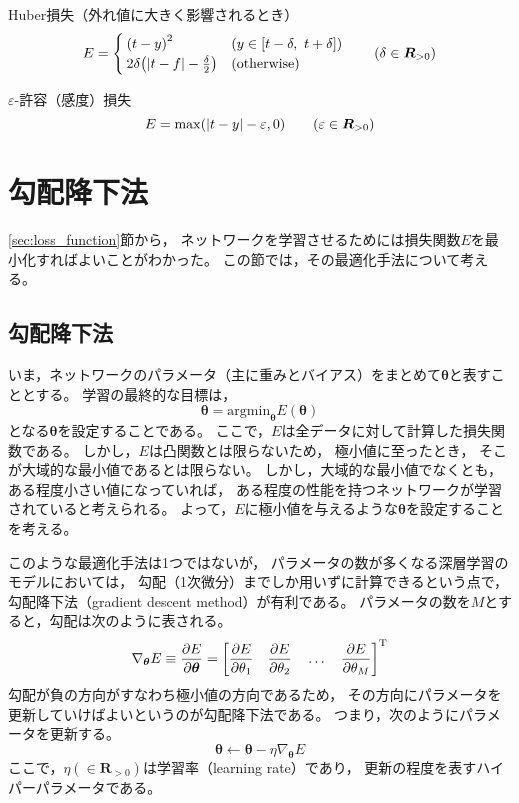 \documentclass[class=jsarticle, crop=false, dvipdfmx, fleqn]{standalone}
\begin{document}
Huber損失（外れ値に大きく影響されるとき）
\begin{equation}
E =
	\begin{cases}
		\qty(t - y)^2 & (y \in \qty[t-\delta,\ t+\delta]) \\
		2\delta \qty(|t - f| - \frac{\delta}{2}) & (\mathrm{otherwise})
	\end{cases}
	\qquad \qty(\delta \in \bm{R}_{>0})
\end{equation}

$\varepsilon$-許容（感度）損失
\begin{equation}
E = \max(|t - y| - \varepsilon, 0) \qquad \qty(\varepsilon \in \bm{R}_{>0})
\end{equation}



\section{勾配降下法}
\label{sec:gradient_descent}

\ref{sec:loss_function}節から，
ネットワークを学習させるためには損失関数$E$を最小化すればよいことがわかった。
この節では，その最適化手法について考える。


\subsection{勾配降下法}

いま，ネットワークのパラメータ（主に重みとバイアス）をまとめて$\bm{\theta}$と表すこととする。
学習の最終的な目標は，
\begin{equation}
\bm{\theta} = \mathrm{argmin}_{\bm{\theta}} E(\bm{\theta})
\end{equation}
となる$\bm{\theta}$を設定することである。
ここで，$E$は全データに対して計算した損失関数である。
しかし，$E$は凸関数とは限らないため，
極小値に至ったとき，
そこが大域的な最小値であるとは限らない。
しかし，大域的な最小値でなくとも，
ある程度小さい値になっていれば，
ある程度の性能を持つネットワークが学習されていると考えられる。
よって，$E$に極小値を与えるような$\bm{\theta}$を設定することを考える。

このような最適化手法は1つではないが，
パラメータの数が多くなる深層学習のモデルにおいては，
勾配（1次微分）までしか用いずに計算できるという点で，
勾配降下法（gradient descent method）が有利である。
パラメータの数を$M$とすると，勾配は次のように表される。
\begin{equation}
\nabla_{\bm{\theta}} E \equiv \pdv{E}{\bm{\theta}} =
	\qty[
		\pdv{E}{\theta_1} \quad
		\pdv{E}{\theta_2} \quad
		\dots \quad
		\pdv{E}{\theta_M}
	]^\mathrm{T}
\end{equation}
勾配が負の方向がすなわち極小値の方向であるため，
その方向にパラメータを更新していけばよいというのが勾配降下法である。
つまり，次のようにパラメータを更新する。
\begin{equation}
\bm{\theta} \leftarrow \bm{\theta} - \eta \nabla_{\bm{\theta}} E
\label{eq:update_param}
\end{equation}
ここで，$\eta (\in \bm{R}_{>0})$は学習率（learning rate）であり，
更新の程度を表すハイパーパラメータである。
\end{document}
